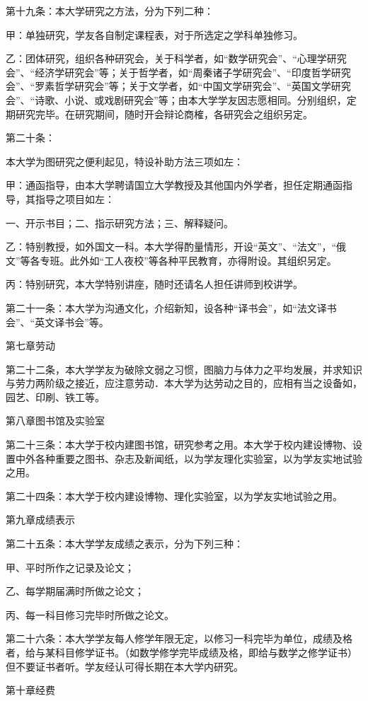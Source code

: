 第十九条：本大学研究之方法，分为下列二种：

甲：单独研究，学友各自制定课程表，对于所选定之学科单独修习。

乙：团体研究，组织各种研究会，关于科学者，如“数学研究会”、“心理学研究会”、“经济学研究会”等；关于哲学者，如“周秦诸子学研究会”、“印度哲学研究会”、“罗素哲学研究会”等；关于文学者，如“中国文学研究会”、“英国文学研究会”、“诗歌、小说、或戏剧研究会”等；由本大学学友因志愿相同。分别组织，定期研究完毕。在研究期间，随时开会辩论商榷，各研究会之组织另定。

第二十条：

本大学为图研究之便利起见，特设补助方法三项如左：

甲：通函指导，由本大学聘请国立大学教授及其他国内外学者，担任定期通函指导，其指导之项目如左：

一、开示书目；二、指示研究方法；三、解释疑问。

乙：特别教授，如外国文一科。本大学得酌量情形，开设“英文”、“法文”，“俄文”等各专班。此外如“工人夜校”等各种平民教育，亦得附设。其组织另定。

丙：特别研究，本大学特别讲座，随时还请名人担任讲师到校讲学。

第二十一条：本大学为沟通文化，介绍新知，设各种“译书会”，如“法文译书会”、“英文译书会”等。

第七章劳动

第二十二条，本大学学友为破除文弱之习惯，图脑力与体力之平均发展，并求知识与劳力两阶级之接近，应注意劳动．本大学为达劳动之目的，应相有当之设备如，园艺、印刷、铁工等。

第八章图书馆及实验室

第二十三条：本大学于校内建图书馆，研究参考之用。本大学于校内建设博物、设置中外各种重要之图书、杂志及新闻纸，以为学友理化实验室，以为学友实地试验之用。

第二十四条：本大学于校内建设博物、理化实验室，以为学友实地试验之用。

第九章成绩表示

第二十五条：本大学学友成绩之表示，分为下列三种：

甲、平时所作之记录及论文；

乙、每学期届满时所做之论文；

丙、每一科目修习完毕时所做之论文。

第二十六条：本大学学友每人修学年限无定，以修习一科完毕为单位，成绩及格者，给与某科目修学证书。（如数学修学完毕成绩及格，即给与数学之修学证书）但不要证书者听。学友经认可得长期在本大学内研究。

第十章经费

